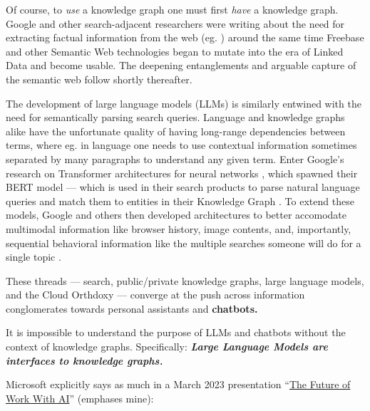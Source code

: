 Of course, to \emph{use} a knowledge graph one must first \emph{have} a
knowledge graph. Google and other search-adjacent researchers were
writing about the need for extracting factual information from the web
(eg. \cite{halevyUnreasonableEffectivenessData2009, pascaTurningWebText2008, pascaWeaklysupervisedDiscoveryNamed2007, pascaOrganizingSearchingWorld2007, pascaOrganizingSearchingWorld2006, pascaAcquisitionCategorizedNamed2004} ) around the same time Freebase
and other Semantic Web technologies began to mutate into the era of
Linked Data and become usable. The deepening entanglements and arguable
capture of the semantic web follow shortly thereafter.

The development of large language models (LLMs) is similarly entwined
with the need for semantically parsing search queries. Language and
knowledge graphs alike have the unfortunate quality of having long-range
dependencies between terms, where eg. in language one needs to use
contextual information sometimes separated by many paragraphs to
understand any given term. Enter Google's research on Transformer
architectures for neural networks \cite{vaswaniAttentionAllYou2017} , which spawned their BERT model \cite{devlinBERTPretrainingDeep2019}  --- which is used in their search
products to parse natural language queries and match them to entities in
their Knowledge Graph \cite{nayakUnderstandingSearchesBetter2019} . To extend these models, Google and others then developed
architectures to better accomodate multimodal information like browser
history, image contents, and, importantly, sequential behavioral
information like the multiple searches someone will do for a single
topic \cite{nayakMUMNewAI2021, tayHyperGridTransformersSingle2021, huUniTMultimodalMultitask2021} .

These threads --- search, public/private knowledge graphs, large
language models, and the Cloud Orthdoxy --- converge at the push across
information conglomerates towards personal assistants and
\textbf{chatbots.}

It is impossible to understand the purpose of LLMs and chatbots without
the context of knowledge graphs. Specifically: \textbf{\emph{Large
Language Models are interfaces to knowledge graphs.}}

Microsoft explicitly says as much in a March 2023 presentation
``\href{https://www.youtube.com/watch?v=Bf-dbS9CcRU}{The Future of Work
With AI}'' (emphases mine):


